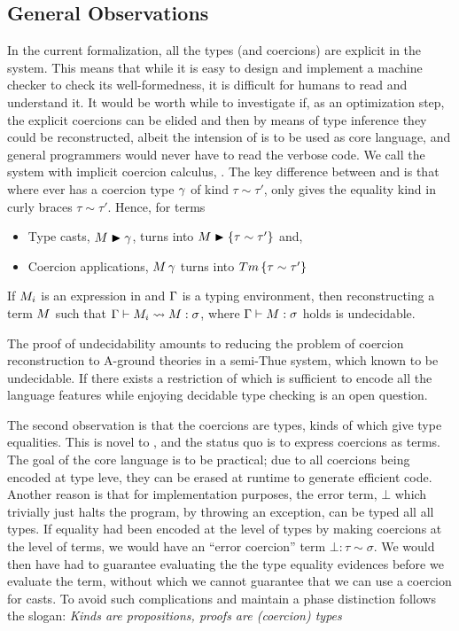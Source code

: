 \documentclass[manuscript,screen,nonacm]{acmart}
\begin{document}
\subsection{General Observations}
In the current formalization, all the types (and coercions) are explicit in the system. This means that while it is easy to design and implement a machine checker to check its well-formedness, it is difficult for humans to read and understand it. It would be worth while to investigate if, as an optimization step, the explicit coercions can be elided and then by means of type inference they could be reconstructed, albeit the intension of \SFC is to be used as core language, and general programmers would never have to read the verbose code. We call the system with implicit coercion calculus, \SFCi. The key difference between \SFC and \SFCi is that where ever \SFC has a coercion type $\gamma$ of kind $\tau\sim\tau'$, \SFCi only gives the equality kind in curly braces $\tau\sim\tau'$. Hence, for terms
\begin{itemize}
\item Type casts, $M\mathrel{\blacktriangleright}\gamma$, turns into $M\mathrel{\blacktriangleright}\{\tau \sim \tau'\}$ and,
\item Coercion applications, $M\,\gamma$ turns into $Tm\,\{\tau \sim \tau'\}$
\end{itemize}

\begin{theorem}
 If $M_i$ is an expression in \SFCi and $\Gamma$ is a typing environment, then reconstructing a \SFC term $M$ such that $\Gamma \vdash M_i \rightsquigarrow M : \sigma$, where $\Gamma \vdash M : \sigma$ holds is undecidable.
\end{theorem}
The proof of undecidability amounts to reducing the problem of coercion reconstruction to A-ground theories in a semi-Thue system, which known to be undecidable\cite{post_recursive_1947}. If there exists a restriction of \SFCi which is sufficient to encode all the language features while enjoying decidable type checking is an open question.

The second observation is that the coercions are types, kinds of which give type equalities. This is novel to \SFC, and the status quo is to express coercions as terms. The goal of the core language is to be practical; due to all coercions being encoded at type leve, they can be erased at runtime to generate efficient code. Another reason is that for implementation purposes, the error term, $\bot$ which trivially just halts the program, by throwing an exception, can be typed all all types. If equality had been encoded at the level of types by making coercions at the level of terms, we would have an ``error coercion'' term $\bot : \tau \sim \sigma$. We would then have had to guarantee evaluating the the type equality evidences before we evaluate the term, without which we cannot guarantee that we can use a coercion for casts. To avoid such complications and maintain a phase distinction \SFC follows the slogan: \emph{Kinds are propositions, proofs are (coercion) types}
\end{document}
